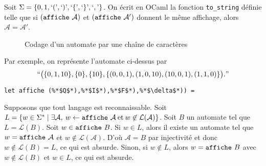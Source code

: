 \begin{exo}
	Soit $\Sigma = \{0,1,`(\text{'},`)\text{'}, `\{\text{'}, `\}\text{'},`,\text{'}\}$.
	On écrit en OCaml la fonction {\tt to\_string}\/ définie telle que si $({\tt affiche}\/\ \mathcal{A})$ et $({\tt affiche}\/\ \mathcal{A}')$ donnent le même affichage, alors $\mathcal{A} = \mathcal{A}'$.

	\begin{figure}[H]
		\centering
		\caption{Codage d'un automate par une chaîne de caractères}
	\end{figure}

	Par exemple, on représente l'automate ci-dessus par \[
		``\big(\{0,1,10\},\{0\}, \{10\}, \{(0,0,1),(1,0,10),(10,0,1),(1,1,0)\}\big)."
	\]

	\begin{lstlisting}[language=caml,caption=Fonction {\tt affiche}\/ affichant un automate]
let affiche (%*$Q$*),%*$I$*),%*$F$*),%*$\delta$*)) = 
	\end{lstlisting}
\end{exo}

\begin{exo}
	Supposons que tout langage est reconnaissable.
	Soit $L = \{w \in \Sigma^*  \mid \exists \mathcal{A},\:w \leftarrow {\tt affiche}\/\ \mathcal{A}\:\text{et}\:w \not\in \mathcal{L}(\mathcal{A})\}$.
	Soit $B$\/ un automate tel que $L = \mathcal{L}(B)$.
	Soit $w \in {\tt affiche}\/\ B$. Si $w \in L$, alors il existe un automate tel que $w = {\tt affiche}\/\ \mathcal{A}$\/ et $w \not\in  \mathcal{L}(\mathcal{A})$. D'où $\mathcal{A} = B$\/ par injectivité et donc $w \not\in  \mathcal{L}(B) = L$, ce qui est absurde.
	Sinon, si $w \not\in L$, alors $w = {\tt affiche}\/\ B$\/ avec $w \not\in  \mathcal{L}(B)$\/ et $w \in L$, ce qui est absurde.
\end{exo}


